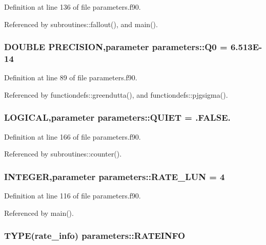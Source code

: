 Definition at line 136 of file parameters.f90.

Referenced by subroutines::fallout(), and main().\hypertarget{namespaceparameters_a14f18e4e92507c1eb5090ad46ff56fd1}{
\subsubsection[{Q0}]{\setlength{\rightskip}{0pt plus 5cm}DOUBLE PRECISION,parameter {\bf parameters::Q0} = 6.513E-\/14}}
\label{namespaceparameters_a14f18e4e92507c1eb5090ad46ff56fd1}


Definition at line 89 of file parameters.f90.

Referenced by functiondefs::greendutta(), and functiondefs::pjgsigma().\hypertarget{namespaceparameters_a76f6259a6055e7668847d95bb689fbb9}{
\subsubsection[{QUIET}]{\setlength{\rightskip}{0pt plus 5cm}LOGICAL,parameter {\bf parameters::QUIET} = .FALSE.}}
\label{namespaceparameters_a76f6259a6055e7668847d95bb689fbb9}


Definition at line 166 of file parameters.f90.

Referenced by subroutines::counter().\hypertarget{namespaceparameters_a70e866c6b47264dcb7895af939679a3c}{
\subsubsection[{RATE\_\-LUN}]{\setlength{\rightskip}{0pt plus 5cm}INTEGER,parameter {\bf parameters::RATE\_\-LUN} = 4}}
\label{namespaceparameters_a70e866c6b47264dcb7895af939679a3c}


Definition at line 116 of file parameters.f90.

Referenced by main().\hypertarget{namespaceparameters_a5725b82ace5b33e1c3394c0622eca5b3}{
\subsubsection[{RATEINFO}]{\setlength{\rightskip}{0pt plus 5cm}TYPE({\bf rate\_\-info}) {\bf parameters::RATEINFO}}}
\label{namespaceparameters_a5725b82ace5b33e1c3394c0622eca5b3}


